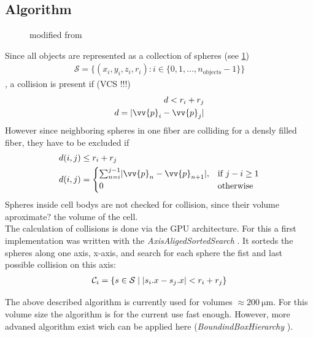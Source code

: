 \subsection{Algorithm}
% 
\begin{figure}[!tb]
\centering
\def\tikzwidth{0.75\textwidth}
\caption{modified from \cite{Ginsburger2019}}
\label{fig:model:medusa_4}
\end{figure}
%
% 
Since all objects are represented as a collection of spheres (see \cref{fig:model:medusa_4})
\begin{align}
    \mathcal{S} = \{ (x_i,y_i,z_i,r_i) : i \in \{0, 1, ..., n_\text{objects}-1\}  \} 
\end{align}
% 
, a collision is present if (VCS !!!)
% 
\begin{align}
\begin{split}
d<r_i+r_j\\
d = \abs{\vv{p}_i - \vv{p}_j}
\end{split}
\end{align}
% 
However since neighboring spheres in one fiber are colliding for a densly filled fiber, they have to be excluded if
\begin{align}
\begin{split}
d(i,j) &\leq  r_i + r_j\\
d(i,j) &= 
\begin{cases}
\sum_{n=i}^{j-1} \abs{\vv{p}_n - \vv{p}_{n+1}},& \text{if } j-i \geq 1\\
0 & \text{otherwise}
\end{cases}
\end{split}
\end{align}
% 
Spheres inside cell bodys are not checked for collision, since their volume aproximate? the volume of the cell.\\
% 
The calculation of collisions is done via the GPU architecture. For this a first implementation was written with the \textit{AxisAligedSortedSearch} \cite{Karras2012}. It sorteds the spheres along one axis, \eg x-axis, and search for each sphere the fist and last possible collision on this axis:
\begin{align}
\begin{split}
\mathcal{C}_i = \{ s \in \mathcal{S} \mid \lvert s_i.x - s_j.x\rvert < r_i+r_j \}
\end{split}
\end{align}
% 
\begin{lstfloat}[!tb]
	
	\caption{Pseudocode of \acs{MEDUSA} collision checking.}
	\label{alg:medusa_collision}
\end{lstfloat}
% 
The above described algorithm is currently used for volumes $\approx \SI{200}{\micro\meter}$. For this volume size the algorithm is for the current use fast enough. However, more advaned algorithm exist wich can be applied here (\eg \textit{BoundindBoxHierarchy} \cite{Karras2012}).
% 
